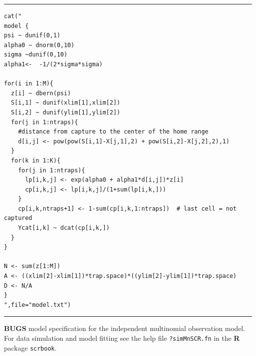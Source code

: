 \begin{panel}[htp]
\centering
\rule[0.15in]{\textwidth}{.03in}
{\small
\begin{verbatim}
cat("
model {
psi ~ dunif(0,1)
alpha0 ~ dnorm(0,10)
sigma ~dunif(0,10)
alpha1<-  -1/(2*sigma*sigma)

for(i in 1:M){
  z[i] ~ dbern(psi)
  S[i,1] ~ dunif(xlim[1],xlim[2])
  S[i,2] ~ dunif(ylim[1],ylim[2])
  for(j in 1:ntraps){
    #distance from capture to the center of the home range
    d[i,j] <- pow(pow(S[i,1]-X[j,1],2) + pow(S[i,2]-X[j,2],2),1)
  }
  for(k in 1:K){
    for(j in 1:ntraps){
      lp[i,k,j] <- exp(alpha0 + alpha1*d[i,j])*z[i]
      cp[i,k,j] <- lp[i,k,j]/(1+sum(lp[i,k,]))
    }
    cp[i,k,ntraps+1] <- 1-sum(cp[i,k,1:ntraps])  # last cell = not captured
    Ycat[i,k] ~ dcat(cp[i,k,])
  }
}

N <- sum(z[1:M])
A <- ((xlim[2]-xlim[1])*trap.space)*((ylim[2]-ylim[1])*trap.space)
D <- N/A
}
",file="model.txt")

\end{verbatim}
}
\rule[-0.15in]{\textwidth}{.03in}
\caption{
{\bf BUGS} model specification for the independent multinomial
observation model. For data simulation and model fitting see the
help file \mbox{\tt ?simMnSCR.fn} in the {\bf R} package \mbox{\tt scrbook}.
}
\label{poisson-mn.panel.mn}
\end{panel}

